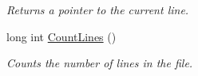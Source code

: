 \begin{CompactItemize}
\begin{CompactList}\small\item\em Returns a pointer to the current line. \item\end{CompactList}\item 
\hypertarget{classFileBuffer_83e9378412806c2646639d2b4c7c457f}{
long int \hyperlink{classFileBuffer_83e9378412806c2646639d2b4c7c457f}{CountLines} ()}
\label{classFileBuffer_83e9378412806c2646639d2b4c7c457f}

\begin{CompactList}\small\item\em Counts the number of lines in the file. \item\end{CompactList}\end{CompactItemize}
